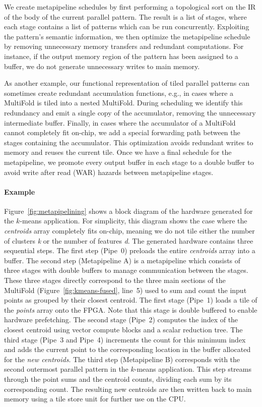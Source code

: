 We create metapipeline schedules by first performing a topological sort on the IR of the body of the current parallel pattern.
The result is a list of stages, where each stage contains a list of patterns which can be run concurrently.
Exploiting the pattern's semantic information, we then
optimize the metapipeline schedule by removing unnecessary memory transfers and redundant computations.
For instance, if the output memory region of the pattern has been assigned to a buffer,
we do not generate unnecessary writes to main memory.

As another example, our functional representation of tiled parallel patterns can sometimes create redundant accumulation functions,
e.g., in cases where a MultiFold is tiled into a nested MultiFold. During scheduling we identify
this redundancy and emit a single copy of the accumulator, removing the unnecessary intermediate buffer.
Finally, in cases where the accumulator of a MultiFold cannot completely fit on-chip, we add a special
forwarding path between the stages containing the accumulator. This optimization avoids redundant writes to memory and
reuses the current tile.
Once we have a final schedule for the metapipeline, we promote every output buffer in each stage
to a double buffer to avoid write after read (WAR) hazards between metapipeline stages.


\paragraph{Example}
Figure~\ref{fig:metapipelining} shows a block diagram of the hardware generated for the $k$-means application.
For simplicity, this diagram shows the case where the \emph{centroids} array completely fits on-chip, meaning
we do not tile either the number of clusters \emph{k} or the number of features \emph{d}.
The generated hardware contains three sequential steps. The first step (Pipe~0) preloads the entire \emph{centroids} array into a buffer.
The second step (Metapipeline A) is a metapipeline which consists of three stages with double buffers to manage communication between the stages.
These three stages directly correspond to the three main sections of the MultiFold (Figure~\ref{fig:kmeans-fused}, line~5) used to sum and count the input points as grouped by their
closest centroid. The first stage (Pipe~1) loads a tile of the \emph{points} array onto the FPGA. Note that this stage is double buffered to
enable hardware prefetching. The second stage (Pipe~2) computes the index of the closest centroid using vector compute blocks and a scalar reduction
tree. The third stage (Pipe~3 and Pipe~4) increments the count for this minimum index and adds the current point to the corresponding location in the
buffer allocated for the \emph{new centroids}.
The third step (Metapipeline B) corresponds with the second outermost parallel pattern in the $k$-means application.
This step streams through the point sums and the centroid counts, dividing each sum by its corresponding count. The resulting new centroids
are then written back to main memory using a tile store unit for further use on the CPU.

